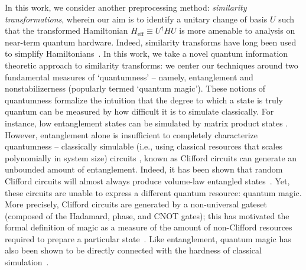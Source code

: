 \documentclass[a4paper,accepted=2024-07-10]{quantumarticle}
\begin{document}
In this work, we consider another preprocessing method: \emph{similarity transformations}, wherein our aim is to identify a unitary change of basis $U$ such that the transformed Hamiltonian $H_{\text{eff}} \equiv U^\dagger H U$ is more amenable to analysis on near-term quantum hardware. Indeed, similarity transforms have long been used to simplify Hamiltonians~\cite{PhysRevB.93.104205,PhysRevB.103.L100207,PhysRevB.94.014205,PhysRevLett.116.247204,PhysRevB.94.045111,roussy_approximate_1973,cederbaum_block_1989,bravyi_schriefferwolff_2011,white_numerical_2002}. In this work, we take a novel quantum information theoretic approach to similarity transforms: we center our techniques around two fundamental measures of `quantumness' -- namely, entanglement and nonstabilizerness (popularly termed `quantum magic'). These notions of quantumness formalize the intuition that the degree to which a state is truly quantum can be measured by how difficult it is to simulate classically. For instance, low entanglement states can be simulated by matrix product states \cite{cirac2021}. However, entanglement alone is insufficient to completely characterize quantumness -- classically simulable (i.e., using classical resources that scales polynomially in system size) circuits \cite{PhysRevA.70.052328}, known as Clifford circuits can generate an unbounded amount of entanglement. Indeed, it has been shown that random Clifford circuits will almost always produce volume-law entangled states~\cite{webb2016clifford}. Yet, these circuits are unable to express a different quantum resource: quantum magic. More precisely, Clifford circuits are generated by a non-universal gateset (composed of the Hadamard, phase, and CNOT gates); this has motivated the formal definition of magic as a measure of the amount of non-Clifford resources required to prepare a particular state~\cite{howard2017application,seddon2019quantifying}. Like entanglement, quantum magic has also been shown to be directly connected with the hardness of classical simulation~\cite{Bravyi_2019}.
\end{document}
